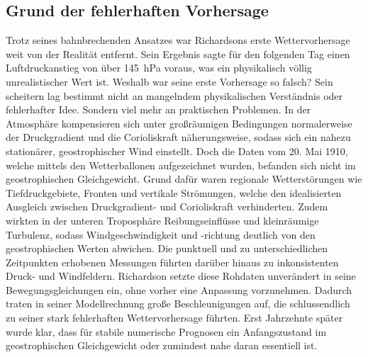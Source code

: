 \subsection{Grund der fehlerhaften Vorhersage \label{geostrophisch:subsection:failedPrediction}}

Trotz seines bahnbrechenden Ansatzes war Richardsons erste Wettervorhersage weit von der Realität entfernt. 
Sein Ergebnis sagte für den folgenden Tag einen Luftdruckanstieg von über \SI{145}{\hecto\pascal} voraus, was ein physikalisch völlig unrealistischer Wert ist. 
Weshalb war seine erste Vorhersage so falsch? 
Sein scheitern lag bestimmt nicht an mangelndem physikalischen Verständnis oder fehlerhafter Idee. 
Sondern viel mehr an praktischen Problemen.
In der Atmosphäre kompensieren sich unter großräumigen Bedingungen normalerweise der Druckgradient und die Corioliskraft näherungsweise, sodass sich ein nahezu stationärer, geostrophischer Wind einstellt.
Doch die Daten vom 20. Mai 1910, welche mittels den Wetterballonen aufgezeichnet wurden, befanden sich nicht im geostrophischen Gleichgewicht.
Grund dafür waren regionale Wetterstörungen wie Tiefdruckgebiete, Fronten und vertikale Strömungen, welche den idealisierten Ausgleich zwischen Druckgradient- und Corioliskraft verhinderten.
Zudem wirkten in der unteren Troposphäre Reibungseinflüsse und kleinräumige Turbulenz, sodass Windgeschwindigkeit und -richtung deutlich von den geostrophischen Werten abwichen.
Die punktuell und zu unterschiedlichen Zeitpunkten erhobenen Messungen führten darüber hinaus zu inkonsistenten Druck- und Windfeldern.
Richardson setzte diese Rohdaten unverändert in seine Bewegungsgleichungen ein, ohne vorher eine Anpassung vorzunehmen.
Dadurch traten in seiner Modellrechnung große Beschleunigungen auf, die schlussendlich zu seiner stark fehlerhaften Wettervorhersage führten.
Erst Jahrzehnte später wurde klar, dass für stabile numerische Prognosen ein Anfangszustand im geostrophischen Gleichgewicht oder zumindest nahe daran essentiell ist.


 



